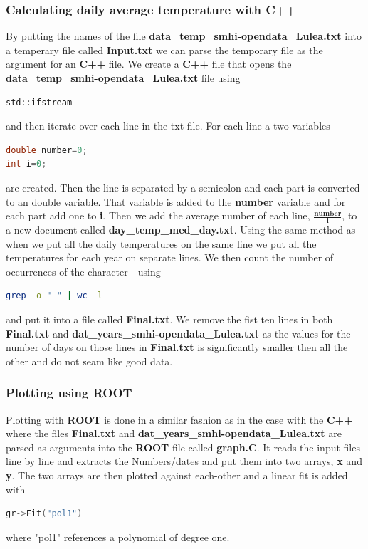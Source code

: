 \documentclass[a4paper]{article}
\begin{document}
\subsubsection{Calculating daily average temperature with C++}
By putting the names of the file \textbf{data\_temp\_smhi-opendata\_Lulea.txt} into a temperary file called \textbf{Input.txt} we can parse the temporary file as the argument for an \textbf{C++} file. We create a \textbf{C++} file that opens the \textbf{data\_temp\_smhi-opendata\_Lulea.txt} file using \begin{lstlisting}[language=C]
std::ifstream
\end{lstlisting} and then iterate over each line in the txt file. For each line a two variables \begin{lstlisting}[language=C]
double number=0;
int i=0;
\end{lstlisting} are created. Then the line is separated by a semicolon and each part is converted to an double variable. That variable  is added to the \textbf{number} variable and for each part add one to \textbf{i}.
Then we add the average number of each line, $\frac{\textbf{number}}{\textbf{i}}$, to a new document called \textbf{day\_temp\_med\_day.txt}. Using the same method as when we put all the daily temperatures on the same line we put all the temperatures for each year on separate lines. We then count the number of occurrences of the character - using \begin{lstlisting}[language=Bash]
grep -o "-" | wc -l
\end{lstlisting} and put it into a file called \textbf{Final.txt}. We remove the fist ten lines in both \textbf{Final.txt} and \textbf{dat\_years\_smhi-opendata\_Lulea.txt} as the values for the number of days on those lines in \textbf{Final.txt} is significantly smaller then all the other and do not seam like good data. 

\subsubsection{Plotting using ROOT}
Plotting with \textbf{ROOT} is done in a similar fashion as in the case with the \textbf{C++} where the files \textbf{Final.txt} and \textbf{dat\_years\_smhi-opendata\_Lulea.txt} are parsed as arguments into the \textbf{ROOT} file called \textbf{graph.C}. It reads the input files line by line and extracts the Numbers/dates and put them into two arrays, \textbf{x} and \textbf{y}. The two arrays are then plotted against each-other and a linear fit is added with 
\begin{lstlisting}[language=C]
gr->Fit("pol1")
\end{lstlisting} where "pol1" references a polynomial of degree one.
\end{document}
